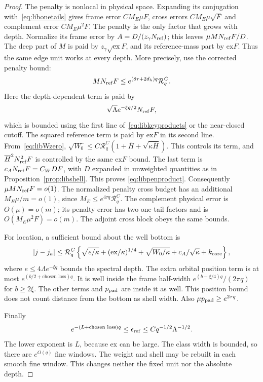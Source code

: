 \begin{proof}
The penalty is nonlocal in physical space. Expanding its conjugation
with~\eqref{eq:libonetails} gives frame error $CM_E\mu F$, cross
errors $CM_E\mu\sqrt F$ and complement error $CM_E\mu^2F$.
The penalty is the only factor that grows with depth. Normalize its
frame error by $A=D/(z_\gamma N_{\rm ref})$; this leaves
$\mu MN_{\rm ref}F/D$. The deep part of $M$ is paid by
$z_\gamma\sqrt{\mathrm{ex}}F$, and its reference-mass part by
$\mathrm{ex}F$. Thus the same edge unit works at every depth.
More precisely, use the corrected penalty bound:
\begin{equation}\label{eq:libpenproduct}
 MN_{\rm ref}F\le e^{(8\tau+2d_h)q}\mathcal R_q^C.
\end{equation}
Here the depth-dependent term is paid by
\[
 \sqrt\Lambda e^{-\xi q/2}N_{\rm ref}F,
\]
which is bounded using the first line of~\eqref{eq:libkeyproducts}
or the near-closed cutoff. The squared reference term is paid by
$\mathrm{ex}F$ in its second line. From~\eqref{eq:libWzero},
$\sqrt{W_0}\le C\mathcal R_q^C
 (1+\overline H+\sqrt{\kappa\overline H})$.
This controls its term, and
$\overline H^2N_{\rm ref}^2F$ is controlled by the same
$\mathrm{ex}F$ bound. The last term is
$c_AN_{\rm ref}F=C_WDF$, with $D$ expanded in unweighted quantities
as in Proposition~\ref{prop:libshell}. This proves
\eqref{eq:libpenproduct}.
Consequently $\mu MN_{\rm ref}F=o(1)$.
The normalized penalty cross budget has an additional
$M_E\mu/m=o(1)$, since $M_E\le e^{4\tau q}\mathcal R_q^C$.
The complement physical error is $O(\mu)=o(m)$; its penalty error
has two one-tail factors and is $O(M_E\mu^2F)=o(m)$.
The adjoint cross block obeys the same bounds.

For location, a sufficient bound about the well bottom is
\begin{equation}\label{eq:libposition}
 |j-j_a|\le\mathcal R_q^C\left\{
 \sqrt{e/\kappa}+(\mathrm{ex}/\kappa)^{1/4}
 +\sqrt{W_0/\kappa}+c_A/\sqrt\kappa+k_{\rm core}\right\},
\end{equation}
where $e\le4\Lambda e^{-\xi q}$ bounds the spectral depth.
The extra orbital position term is at most $e^{(b/2+\text{chosen loss})q}$.
It is well inside the frame half-width
$e^{(b-\xi/4)q}/(2\pi q)$ for $b\ge2\xi$.
The other terms and $p_{\rm pad}$ are inside it as well.
This position bound does not count distance from the bottom as shell
width. Also $\mu p_{\rm pad}\ge e^{2\tau q}$.

Finally
\[
 e^{-(L+\text{chosen loss})q}\le\epsilon_{\rm ref}
      \le Cq^{-1/2}\Lambda^{-1/2}.
\]
The lower exponent is $L$, because $\mathrm{ex}$ can be large.
The class width is bounded, so there are $e^{O(q)}$ fine windows.
The weight and shell may be rebuilt in each smooth fine window.
This changes neither the fixed unit nor the absolute depth.
\end{proof}


